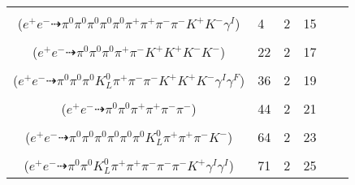 \documentclass[landscape]{article}
\newcounter{rownumbers}
\newcommand\rn{\stepcounter{rownumbers}\arabic{rownumbers}}
\newcommand{\EOL}{\\} %
\newcommand{\topoTags}[1]{#1} %
\begin{document}
\begin{longtable}{clcccc}
\rn & \makecell[l]{ $ 
e^{+} e^{-} \rightarrow \pi^{0} \pi^{0} \pi^{0} \pi^{+} \pi^{-} \omega K^{-} K^{*+} \gamma^{I} ,
\omega \rightarrow \pi^{0} \pi^{+} \pi^{-} ,
K^{*+} \rightarrow \pi^{0} K^{+} 
$ \\ ($
e^{+} e^{-} \dashrightarrow \pi^{0} \pi^{0} \pi^{0} \pi^{0} \pi^{0} \pi^{+} \pi^{+} \pi^{-} \pi^{-} K^{+} K^{-} \gamma^{I} 
$) } & \topoTags{4 & }2 & 15 \EOL

\rn & \makecell[l]{ $ 
e^{+} e^{-} \rightarrow \pi^{0} \pi^{-} \rho^{+} K^{+} K^{*-} \phi ,
\rho^{+} \rightarrow \pi^{0} \pi^{+} ,
K^{*-} \rightarrow \pi^{0} K^{-} ,
\phi \rightarrow K^{+} K^{-} 
$ \\ ($
e^{+} e^{-} \dashrightarrow \pi^{0} \pi^{0} \pi^{0} \pi^{+} \pi^{-} K^{+} K^{+} K^{-} K^{-} 
$) } & \topoTags{22 & }2 & 17 \EOL

\rn & \makecell[l]{ $ 
e^{+} e^{-} \rightarrow \pi^{0} \pi^{0} \omega \bar{K}^{0} K^{*} K^{+} K^{-} \gamma^{I} ,
\omega \rightarrow \pi^{0} \pi^{+} \pi^{-} \gamma^{F} ,
\bar{K}^{0} \rightarrow K_{L}^{0} ,
K^{*} \rightarrow \pi^{-} K^{+} 
$ \\ ($
e^{+} e^{-} \dashrightarrow \pi^{0} \pi^{0} \pi^{0} K_{L}^{0} \pi^{+} \pi^{-} \pi^{-} K^{+} K^{+} K^{-} \gamma^{I} \gamma^{F} 
$) } & \topoTags{36 & }2 & 19 \EOL

\rn & \makecell[l]{ $ 
e^{+} e^{-} \rightarrow \pi^{0} \pi^{+} \pi^{-} \pi^{-} \rho^{+} ,
\rho^{+} \rightarrow \pi^{0} \pi^{+} 
$ \\ ($
e^{+} e^{-} \dashrightarrow \pi^{0} \pi^{0} \pi^{+} \pi^{+} \pi^{-} \pi^{-} 
$) } & \topoTags{44 & }2 & 21 \EOL

\rn & \makecell[l]{ $ 
e^{+} e^{-} \rightarrow \pi^{0} \pi^{0} \pi^{0} \pi^{0} \pi^{0} \pi^{0} \pi^{-} \bar{K}^{*} K^{*+} ,
\bar{K}^{*} \rightarrow \pi^{+} K^{-} ,
K^{*+} \rightarrow \pi^{+} K^{0} ,
K^{0} \rightarrow K_{L}^{0} 
$ \\ ($
e^{+} e^{-} \dashrightarrow \pi^{0} \pi^{0} \pi^{0} \pi^{0} \pi^{0} \pi^{0} K_{L}^{0} \pi^{+} \pi^{+} \pi^{-} K^{-} 
$) } & \topoTags{64 & }2 & 23 \EOL

\rn & \makecell[l]{ $ 
e^{+} e^{-} \rightarrow \pi^{0} \pi^{+} \pi^{+} \pi^{-} \rho^{-} K^{+} K^{*-} \gamma^{I} \gamma^{I} ,
\rho^{-} \rightarrow \pi^{0} \pi^{-} ,
K^{*-} \rightarrow \pi^{-} \bar{K}^{0} ,
\bar{K}^{0} \rightarrow K_{L}^{0} 
$ \\ ($
e^{+} e^{-} \dashrightarrow \pi^{0} \pi^{0} K_{L}^{0} \pi^{+} \pi^{+} \pi^{-} \pi^{-} \pi^{-} K^{+} \gamma^{I} \gamma^{I} 
$) } & \topoTags{71 & }2 & 25 \EOL


\end{longtable}
\end{document}
